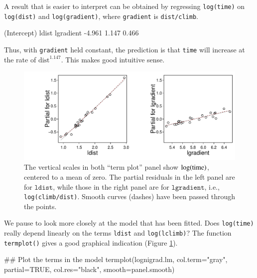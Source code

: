 \documentclass{tufte-book}\usepackage[]{graphicx}\usepackage[]{color}
\newcommand{\txtt}[1]{\texttt{#1}}
\begin{document}
A result that is easier to interpret can be obtained by regressing
\txtt{log(time)} on \txtt{log(dist)} and \txtt{log(gradient)},
where \txtt{gradient} is \txtt{dist/climb}.
\begin{Schunk}
\begin{Soutput}
(Intercept)       ldist   lgradient 
     -4.961       1.147       0.466 
\end{Soutput}
\end{Schunk}
Thus, with \txtt{gradient} held constant, the prediction is that \txtt{time}
will increase at the rate of $\mbox{dist}^{1.147}$.  This makes good intuitive
sense.

\begin{figure}
\begin{Schunk}


\centerline{\includegraphics[width=\textwidth]{figs/8-tplot-ni-1} }

\end{Schunk}
\caption{The vertical scales in both ``term plot''  panel
  show $\log(\rm{time})$, centered to a mean of zero. The partial residuals
  in the left panel are for $\txtt{ldist}$, while those in the right
  panel are for $\txtt{lgradient}$, i.e.,
  \txtt{log(climb/dist)}. Smooth curves (dashes) have been passed
  through the points.\label{fig:lnihills-lin}}
\vspace*{-5pt}
\end{figure}

We pause to look more closely at the model that has been fitted.  Does
\txtt{log(time)} really depend linearly on the terms \txtt{ldist} and
\txtt{log(lclimb)}?  The function \txtt{termplot()} gives a good
graphical indication (Figure \ref{fig:lnihills-lin}).
\begin{Schunk}
\begin{Sinput}
## Plot the terms in the model
termplot(lognigrad.lm, col.term="gray", partial=TRUE,
         col.res="black", smooth=panel.smooth)
\end{Sinput}
\end{Schunk}
\end{document}
